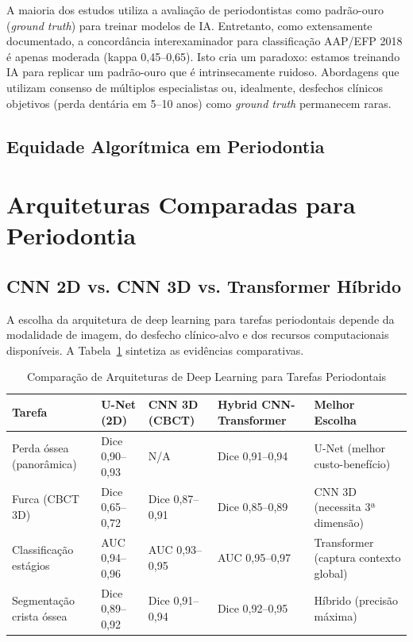 A maioria dos estudos utiliza a avaliação de periodontistas como padrão-ouro (\textit{ground truth}) para treinar modelos de IA. Entretanto, como extensamente documentado, a concordância interexaminador para classificação AAP/EFP 2018 é apenas moderada (kappa 0,45--0,65). Isto cria um paradoxo: estamos treinando IA para replicar um padrão-ouro que é intrinsecamente ruidoso. Abordagens que utilizam consenso de múltiplos especialistas ou, idealmente, desfechos clínicos objetivos (perda dentária em 5--10 anos) como \textit{ground truth} permanecem raras.

\subsection{Equidade Algorítmica em Periodontia}


\section{Arquiteturas Comparadas para Periodontia}

\subsection{CNN 2D vs. CNN 3D vs. Transformer Híbrido}

A escolha da arquitetura de deep learning para tarefas periodontais depende da modalidade de imagem, do desfecho clínico-alvo e dos recursos computacionais disponíveis. A Tabela~\ref{tab:arquiteturas-periodontia} sintetiza as evidências comparativas.

\begin{table}[H]
\centering
\caption{Comparação de Arquiteturas de Deep Learning para Tarefas Periodontais}
\label{tab:arquiteturas-periodontia}
\begin{tabular}{p{2.5cm}p{2.2cm}p{2.2cm}p{2.5cm}p{2.5cm}}
\toprule
\textbf{Tarefa} & \textbf{U-Net (2D)} & \textbf{CNN 3D (CBCT)} & \textbf{Hybrid CNN-Transformer} & \textbf{Melhor Escolha} \\
\midrule
Perda óssea (panorâmica) & Dice 0,90--0,93 & N/A & Dice 0,91--0,94 & U-Net (melhor custo-benefício) \\
Furca (CBCT 3D) & Dice 0,65--0,72 & Dice 0,87--0,91 & Dice 0,85--0,89 & CNN 3D (necessita 3ª dimensão) \\
Classificação estágios & AUC 0,94--0,96 & AUC 0,93--0,95 & AUC 0,95--0,97 & Transformer (captura contexto global) \\
Segmentação crista óssea & Dice 0,89--0,92 & Dice 0,91--0,94 & Dice 0,92--0,95 & Híbrido (precisão máxima) \\
\bottomrule
\end{tabular}
\end{table}


